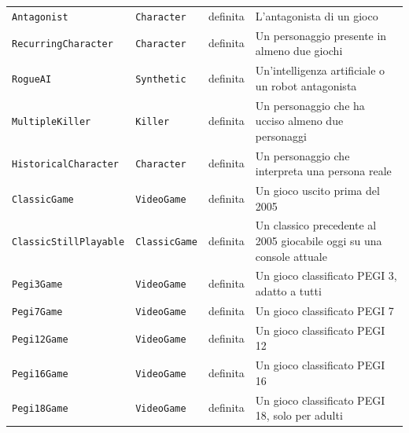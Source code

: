 \begin{longtable}{lllp{5.8cm}}
\texttt{Antagonist} & \texttt{Character} & definita & L'antagonista di un gioco \\
\texttt{RecurringCharacter} & \texttt{Character} & definita & Un personaggio presente in almeno due giochi \\
\texttt{RogueAI} & \texttt{Synthetic} & definita & Un'intelligenza artificiale o un robot antagonista \\
\texttt{MultipleKiller} & \texttt{Killer} & definita & Un personaggio che ha ucciso almeno due personaggi \\
\texttt{HistoricalCharacter} & \texttt{Character} & definita & Un personaggio che interpreta una persona reale \\
\texttt{ClassicGame} & \texttt{VideoGame} & definita & Un gioco uscito prima del 2005 \\
\texttt{ClassicStillPlayable} & \texttt{ClassicGame} & definita & Un classico precedente al 2005 giocabile oggi su una console attuale \\
\texttt{Pegi3Game} & \texttt{VideoGame} & definita & Un gioco classificato PEGI 3, adatto a tutti \\
\texttt{Pegi7Game} & \texttt{VideoGame} & definita & Un gioco classificato PEGI 7 \\
\texttt{Pegi12Game} & \texttt{VideoGame} & definita & Un gioco classificato PEGI 12 \\
\texttt{Pegi16Game} & \texttt{VideoGame} & definita & Un gioco classificato PEGI 16 \\
\texttt{Pegi18Game} & \texttt{VideoGame} & definita & Un gioco classificato PEGI 18, solo per adulti \\
\end{longtable}\endgroup

